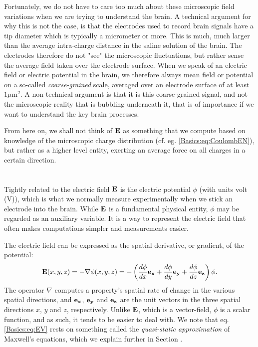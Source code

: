 Fortunately, we do not have to care too much about these microscopic field variations when we are trying to understand the brain. A technical argument for why this is not the case, is that the electrodes used to record brain signals have a tip diameter which is typically a micrometer or more. This is much, much larger than the average intra-charge distance in the saline solution of the brain. The electrodes therefore do not "see" the microscopic fluctuations, but rather sense the average field taken over the electrode surface. When we speak of an electric field or electric potential in the brain, we therefore always mean field or potential on a so-called \textit{coarse-grained} scale, averaged over an electrode surface of at least $1 \mu$m$^2$. A non-technical argument is that it is this coarse-grained signal, and not the microscopic reality that is bubbling underneath it, that is of importance if we want to understand the key brain processes. 

From here on, we shall not think of ${\bf E}$ as something that we compute based on
knowledge of the microscopic charge distribution (cf. eg. \ref{Basics:eq:CoulombEN}), but rather as a higher level entity, exerting an average force on all charges in a certain direction.


\section{}
\label{sec:Basics:Potential} 
Tightly related to the electric field ${\bf E}$ is the electric potential $\phi$ (with units volt (V)), which is what we normally measure experimentally when we stick an electrode into the brain. While ${\bf E}$ is a fundamental physical entity, $\phi$ may be regarded as an auxiliary variable. It is a way to represent the electric field that often makes computations simpler and measurements easier. 

The electric field can be expressed as the spatial derivative, or gradient, of the potential:
\begin{equation}
{\bf E}(x,y,z) = - \nabla \phi(x,y,z) = - \left(\frac{d\phi}{dx} {\bf e_x}  + \frac{d\phi}{dy} {\bf e_y} + \frac{d\phi}{dz} {\bf e_z} \right) \phi.
\label{Basics:eq:EV}
\end{equation}
The operator $\nabla$ computes a property's spatial rate of change in the various spatial directions, and ${\bf e_x}$, ${\bf e_y}$ and  ${\bf e_z}$ are the unit vectors in the three spatial directions $x$, $y$ and $z$, respectively. Unlike ${\bf E}$, which is a vector-field, $\phi$ is a scalar function, and as such, it tends to be easier to deal with. We note that eq. \ref{Basics:eq:EV} rests on something called the \textit{quasi-static approximation} of Maxwell's equations, which we explain further in Section \label{sec:Basics:Maxwell}. 

